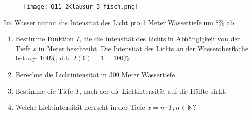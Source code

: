 \documentclass[a4paper,12pt]{article}
\begin{document}
  \begin{figure}[H]
    \centering
    \texttt{[image: Q11\_2Klausur\_3\_fisch.png]}
  \end{figure}

Im Wasser nimmt die Intensität des Licht pro 1 Meter Wassertiefe um 8\% ab.

\begin{enumerate}[label={\alph*)}]
  \item Bestimme Funktion $I$, die die Intensität des Lichts in Abhängigkeit von der Tiefe $x$ in Meter beschreibt. Die Intensität des Lichts an der Wasseroberfläche betrage 100\%; d.h. $I(0)=1=100\%$.

  \item Berechne die Lichtintensität in 300 Meter Wassertiefe.

  \item Bestimme die Tiefe $T$, nach der die Lichtintensität auf die Hälfte sinkt. 
  \item Welche Lichtintensität herrscht in der Tiefe $x = n\cdot T; n \in \mathbb{N}$?
\end{enumerate}



\end{document}
